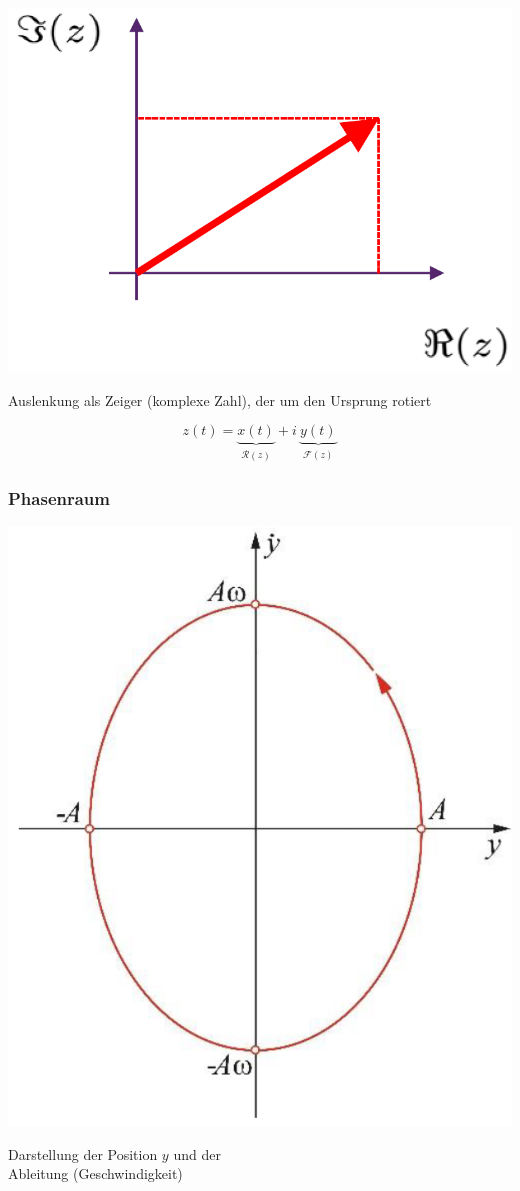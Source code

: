 \begin{minipage}{0.38\linewidth}
\includegraphics[width=0.9\linewidth]{Bilder/Wellen-Optik/zeigerdarstellung}
\end{minipage}
\hfill
\begin{minipage}{0.58\linewidth}
Auslenkung als Zeiger (komplexe Zahl), der um den Ursprung rotiert 

$$ z(t) = \underbrace{ x(t) }_{\substack{\mathcal{R} (z)}} + i \, \underbrace{ y(t) }_{\substack{ \mathcal{F} (z)}} $$
\end{minipage}


\subsubsection{Phasenraum}

\begin{minipage}{0.38\linewidth}
\includegraphics[width=0.7\linewidth]{Bilder/Wellen-Optik/phasenraum}
\end{minipage}
\hfill
\begin{minipage}{0.58\linewidth}
Darstellung der Position $y$ und der \\
Ableitung (Geschwindigkeit)
\end{minipage}



